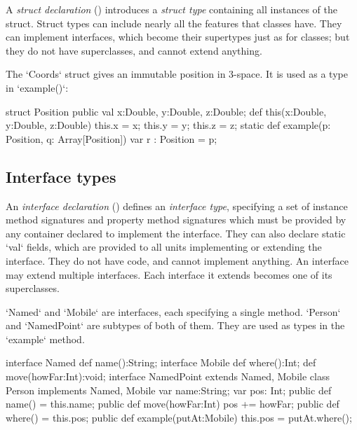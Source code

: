 A {\em struct declaration} () introduces a {\em struct type}
containing all instances of the struct.     Struct types can include nearly
all the features that classes have.  They can implement interfaces, which
become their supertypes just as for classes; but they do not have
superclasses, and cannot extend anything.  

\begin{ex}
The \xcd`Coords` struct  gives
an immutable position in 3-space.  It is used as a type in \xcd`example()`: 
\begin{xten}
struct Position {
  public val x:Double, y:Double, z:Double; 
  def this(x:Double, y:Double, z:Double) {
     this.x = x; this.y = y; this.z = z;
  }
  static def example(p: Position, q: Array[Position]) {  
     var r : Position = p;
  }
}
\end{xten}
%
\end{ex}


\subsection{Interface types}
\label{InterfaceTypes}


An {\em interface declaration} () defines an {\em
interface type}, specifying a set of instance method signatures  and property
method signatures 
which must be provided by any container declared to implement the interface.
They can also declare static \xcd`val` fields, which are provided to all
units implementing or extending the interface.   They do not have code, and
cannot implement anything.
An interface may extend multiple interfaces.  
Each interface it extends becomes one of its superclasses.


\begin{ex}
\xcd`Named` and \xcd`Mobile` are interfaces, each specifying a single method.  
\xcd`Person` and \xcd`NamedPoint` are subtypes of both of them.  They are used
as types 
in the \xcd`example` method.
\begin{xten}
interface Named {
  def name():String;
}
interface Mobile {
  def where():Int;
  def move(howFar:Int):void;
}
interface NamedPoint extends Named, Mobile {} 
class Person implements Named, Mobile {
   var name:String; var pos: Int;
   public def name() = this.name; 
   public def move(howFar:Int) { pos += howFar; }
   public def where() = this.pos;
   public def example(putAt:Mobile) {
      this.pos = putAt.where();
   }
}

\end{xten}
%
\end{ex}




